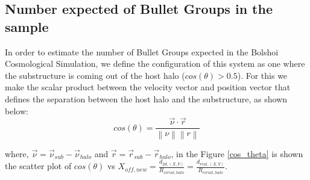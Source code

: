 \documentclass{emulateapj}
\begin{document}
\begin{figure*}
\begin{center}
\end{center}
\caption{Cumulative distribution (P$>d_{2d,(X,Y)}$) of displacements
  for the projection (X,Y). {\bf Left panel:} Sample with
  $\nu_{max}>700$ kms$^{-1}$  for different redshifts. The vertical
  dashed line, correspond to the separation between dark matter to
  dark matter estimate in this work as the double of separation
  between the collisional gas and dark matter of 124$\pm$20 kpc
  reported by \citet{Gastaldello} for the group SL2S J08544-0121.
  {\bf Right panel:} Sample with $300 $ kms$^{-1} <\nu_{max}<700 $
  kms$^{-1}$ for different redshifts.}  
\label{displacements}
\end{figure*}


\subsection{Number expected of Bullet Groups in the sample}


In order to estimate the number of Bullet Groups expected in the
Bolshoi Cosmological Simulation, we define the configuration of this system as one where the substructure is coming out of the host halo ($cos(\theta)>0.5$). For this 
we make the scalar product between the velocity vector and position vector that defines the separation between 
 the host halo and the substructure, as shown below: \\
 
 \begin{equation}
  cos(\theta)=\frac{\vec{\nu{}}\cdotp{}\vec{r}}{\left\|\nu{}\right\| \left\|r\right\|}
 \end{equation}

where, $\vec{\nu{}}=\vec{\nu}_{sub}-\vec{\nu}_{halo}$ and $\vec{r}=\vec{r}_{sub}-\vec{r}_{halo}$, in the Figure \ref{cos_theta}
is shown the scatter plot of $cos(\theta{})$ vs $X_{off,new}=\frac{d_{2d,(X,Y)}}{R_{virial,halo}}=\frac{d_{real,(X,Y)}}{R_{virial,halo}}$.  


\begin{figure*}
\begin{center}
\end{center}
\caption{Scatter of $cos(\theta)$ vs $X_{off,new}$. The red dashed line correpond to the limit for $cos(\theta{})>0.5$,  
where the substructure is emerging from the host halo and  $\left(\frac{\nu_{circ,sub}}{\nu_{circ,halo}}\right)\geq0.5$, 
cicular velocities $<700$ kms$^{-1}$ and different redshifts.} 
\label{cos_theta}
\end{figure*}
\end{document}
